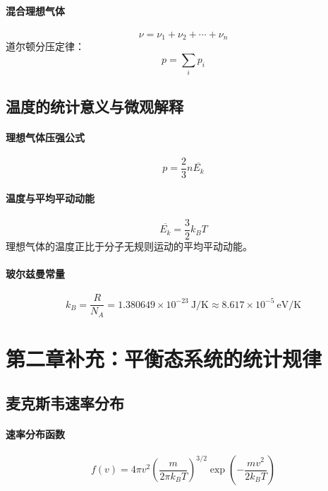 \documentclass[UTF8]{ctexart}
\begin{document}
\paragraph{混合理想气体}
\[
\nu=\nu_1+\nu_2+\cdots+\nu_n
\]
道尔顿分压定律：
\[
\boxed{p=\sum_i p_i}
\]

\subsection{温度的统计意义与微观解释}

\paragraph{理想气体压强公式}
\[
\boxed{p=\frac{2}{3}n\overline{E_k}}
\]

\paragraph{温度与平均平动动能}
\[
\boxed{\overline{E_k}=\frac{3}{2}k_B T}
\]
理想气体的温度正比于分子无规则运动的平均平动动能。

\paragraph{玻尔兹曼常量}
\[
k_B=\frac{R}{N_A}=1.380649\times 10^{-23}\ \mathrm{J/K}\approx 8.617\times 10^{-5}\ \mathrm{eV/K}
\]


\section{第二章补充：平衡态系统的统计规律}

\subsection{麦克斯韦速率分布}

\paragraph{速率分布函数}
\[
f(v)=4\pi v^2\left(\frac{m}{2\pi k_B T}\right)^{3/2}\exp\!\left(-\frac{mv^2}{2k_B T}\right)
\]
\end{document}
